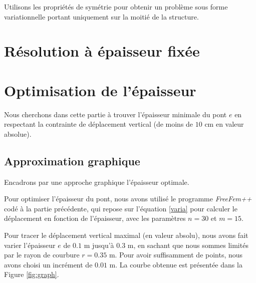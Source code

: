 \documentclass{article}
\begin{document}
    
    

    \begin{problem}{2}
    Utilisons les propriétés de symétrie pour obtenir un problème sous forme variationnelle portant uniquement sur la moitié de la structure.
    \end{problem}
    
    

    \section{Résolution à épaisseur fixée}
        
    \section{Optimisation de l'épaisseur}

    Nous cherchons dans cette partie à trouver l'épaisseur minimale du pont $e$ en respectant la contrainte de déplacement vertical (de moins de $10$ cm en valeur absolue).

    \subsection{Approximation graphique}
    \begin{problem}{5}
        Encadrons par une approche graphique l'épaisseur optimale.
    \end{problem}
    Pour optimiser l'épaisseur du pont,
     nous avons utilisé le programme \emph{FreeFem++} codé à la partie précédente,
     qui repose sur l'équation \ref{varia} pour calculer le déplacement en fonction de l'épaisseur, avec les paramètres $n=30$ et $m=15$.

    Pour tracer le déplacement vertical maximal (en valeur absolu),
    nous avons fait varier l'épaisseur $e$
    de $0.1$ m jusqu'à $0.3$ m, en sachant que nous sommes limités par le rayon de courbure $r = 0.35$ m.
    Pour avoir suffisamment de points, nous avons choisi un incrément de $0.01$ m.
    La courbe obtenue est présentée dans la Figure \ref{fig:graph}.
\end{document}
